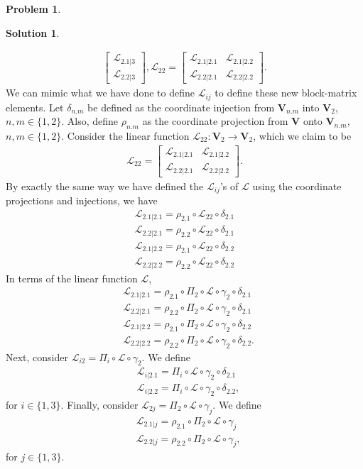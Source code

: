 \documentclass{article}
\theoremstyle{definition}
\newtheorem*{prob*}{Problem}
\newtheorem*{sln*}{Solution}
\newcommand{\V}{\mathbf{V}}
\newcommand{\lag}{\mathcal{L}}
\begin{document}
\begin{prob*}
\begin{sln*}
\begin{enumerate}
\begin{align*}
\begin{bmatrix}
		\lag_{2.1|3}\\\lag_{2.2|3}
		\end{bmatrix},
		\lag_{22} = \begin{bmatrix}
		\lag_{2.1|2.1} & \lag_{2.1|2.2}\\
		\lag_{2.2|2.1} & \lag_{2.2|2.2}
		\end{bmatrix}.
		\end{align*}
		We can mimic what we have done to define $\lag_{ij}$ to define these new block-matrix elements. Let $\delta_{n.m}$ be defined as the coordinate injection from $\V_{n.m}$ into $\V_2$, $n,m \in \{1,2\}$. Also, define $\rho_{n.m}$ as the coordinate projection from $\V$ onto $\V_{n.m}$, $n,m\in \{1,2\}$. Consider the linear function $\lag_{22} : \V_2 \to \V_2$, which we claim to be
		\begin{align*}
		\lag_{22} = \begin{bmatrix}
		\lag_{2.1|2.1} & \lag_{2.1|2.2}\\
		\lag_{2.2|2.1} & \lag_{2.2|2.2}
		\end{bmatrix}.
		\end{align*}
		By exactly the same way we have defined the $\lag_{ij}$'s of $\lag$ using the coordinate projections and injections, we have
		\begin{align*}
		\lag_{2.1|2.1} = \rho_{2.1}\circ \lag_{22} \circ \delta_{2.1}\\
		\lag_{2.2|2.1} = \rho_{2.2}\circ \lag_{22} \circ \delta_{2.1}\\
		\lag_{2.1|2.2} = \rho_{2.1}\circ \lag_{22} \circ \delta_{2.2}\\
		\lag_{2.2|2.2} = \rho_{2.2}\circ \lag_{22} \circ \delta_{2.2}
		\end{align*}
		In terms of the linear function $\lag$,
		\begin{align*}
		&\lag_{2.1|2.1} = \rho_{2.1}\circ \Pi_2 \circ \lag \circ \gamma_2 \circ \delta_{2.1}\\
		&\lag_{2.2|2.1} = \rho_{2.2}\circ \Pi_2 \circ \lag \circ \gamma_2 \circ \delta_{2.1}\\
		&\lag_{2.1|2.2} = \rho_{2.1}\circ \Pi_2 \circ \lag \circ \gamma_2 \circ \delta_{2.2}\\
		&\lag_{2.2|2.2} = \rho_{2.2}\circ \Pi_2 \circ \lag \circ \gamma_2 \circ \delta_{2.2}.
		\end{align*}
		Next, consider $\lag_{i2} = \Pi_i \circ \lag \circ \gamma_2$. We define
		\begin{align*}
		&\lag_{i|2.1} = \Pi_i \circ \lag \circ \gamma_2 \circ \delta_{2.1}\\
		&\lag_{i|2.2} = \Pi_i \circ \lag \circ \gamma_2 \circ \delta_{2.2},
		\end{align*} 
		for $i\in \{1,3\}$. Finally, consider $\lag_{2j} = \Pi_2 \circ \lag \circ \gamma_j$. We define
		\begin{align*}
		&\lag_{2.1|j} = \rho_{2.1} \circ \Pi_2 \circ \lag \circ \gamma_j\\
		&\lag_{2.2|j} = \rho_{2.2} \circ \Pi_2 \circ \lag \circ \gamma_j,
		\end{align*}
		for $j \in \{1,3\}$. \\
		

\end{enumerate}
\end{sln*}
\end{prob*}
\end{document}

